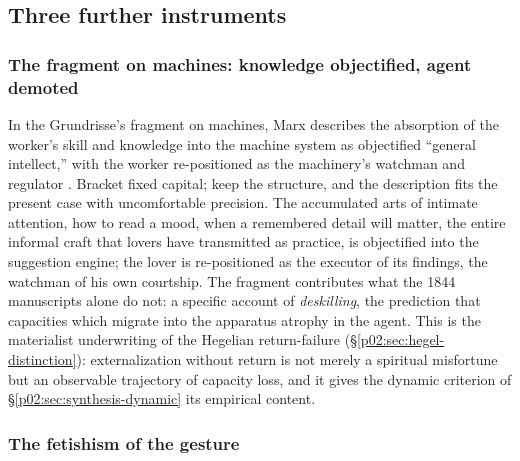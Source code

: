 \subsection{Three further instruments}
\label{p02:sec:marx-instruments}

\subsubsection{The fragment on machines: knowledge objectified, agent demoted}
\label{p02:sec:marx-fragment}

In the Grundrisse's fragment on machines, Marx describes the absorption of the worker's skill and knowledge into the machine system as objectified ``general intellect,'' with the worker re-positioned as the machinery's watchman and regulator \parencite{marx1857grundrisse}. Bracket fixed capital; keep the structure, and the description fits the present case with uncomfortable precision. The accumulated arts of intimate attention, how to read a mood, when a remembered detail will matter, the entire informal craft that lovers have transmitted as practice, is objectified into the suggestion engine; the lover is re-positioned as the executor of its findings, the watchman of his own courtship. The fragment contributes what the 1844 manuscripts alone do not: a specific account of \emph{deskilling}, the prediction that capacities which migrate into the apparatus atrophy in the agent. This is the materialist underwriting of the Hegelian return-failure (\S\ref{p02:sec:hegel-distinction}): externalization without return is not merely a spiritual misfortune but an observable trajectory of capacity loss, and it gives the dynamic criterion of \S\ref{p02:sec:synthesis-dynamic} its empirical content.

\subsubsection{The fetishism of the gesture}
\label{p02:sec:marx-fetish}

